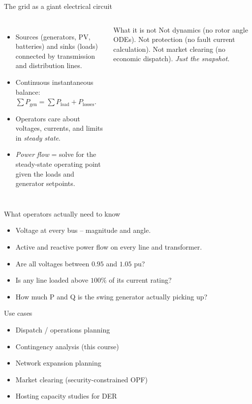 \documentclass[aspectratio=169,10pt]{beamer}
\begin{document}
\begin{frame}{The grid as a giant electrical circuit}
\begin{columns}[T]
\begin{itemize}
  \item Sources (generators, PV, batteries) and sinks (loads) connected by transmission and distribution lines.
  \item Continuous instantaneous balance: $\sum P_{\text{gen}} = \sum P_{\text{load}} + P_{\text{losses}}$.
  \item Operators care about voltages, currents, and limits in \emph{steady state}.
  \item \emph{Power flow} = solve for the steady-state operating point given the loads and generator setpoints.
\end{itemize}
\begin{block}{What it is not}
Not dynamics (no rotor angle ODEs). Not protection (no fault current calculation). Not market clearing (no economic dispatch). \emph{Just the snapshot.}
\end{block}
\end{columns}
\end{frame}

\begin{frame}{What operators actually need to know}
\begin{itemize}
  \item Voltage at every bus -- magnitude and angle.
  \item Active and reactive power flow on every line and transformer.
  \item Are all voltages between $0.95$ and $1.05$ pu?
  \item Is any line loaded above $100\%$ of its current rating?
  \item How much P and Q is the swing generator actually picking up?
\end{itemize}
\vspace{0.5em}
\begin{block}{Use cases}
\begin{itemize}
  \item Dispatch / operations planning
  \item Contingency analysis (this course)
  \item Network expansion planning
  \item Market clearing (security-constrained OPF)
  \item Hosting capacity studies for DER
\end{itemize}
\end{block}
\end{frame}
\end{document}
